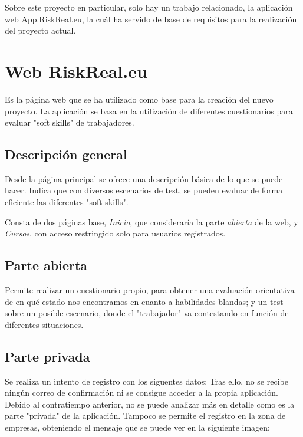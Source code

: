 
Sobre este proyecto en particular, solo hay un trabajo relacionado, la aplicación web App.RiskReal.eu, la cuál ha servido de base de requisitos para la realización del proyecto actual.

\section{Web RiskReal.eu}
Es la página web \cite{web:riskreal} que se ha utilizado como base para la creación del nuevo proyecto.
La aplicación se basa en la utilización de diferentes cuestionarios para evaluar "soft skills" de trabajadores.

\subsection{Descripción general}
Desde la página principal se ofrece una descripción básica de lo que se puede hacer.
Indica que con diversos escenarios de test, se pueden evaluar de forma eficiente las diferentes "soft skills".

Consta de dos páginas base, \textit{Inicio}, que consideraría la parte \textit{abierta} de la web, y \textit{Cursos}, con acceso restringido solo para usuarios registrados.

\subsection{Parte abierta}
Permite realizar un cuestionario propio, para obtener una evaluación orientativa de en qué estado nos encontramos en cuanto a habilidades blandas; y un test sobre un posible escenario, donde el "trabajador" va contestando en función de diferentes situaciones.

\subsection{Parte privada}
Se realiza un intento de registro con los siguentes datos:
Tras ello, no se recibe ningún correo de confirmación ni se consigue acceder a la propia aplicación.
Debido al contratiempo anterior, no se puede analizar más en detalle como es la parte "privada" de la aplicación.
Tampoco se permite el registro en la zona de empresas, obteniendo el mensaje que se puede ver en la siguiente imagen:





